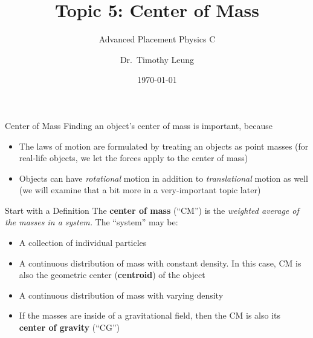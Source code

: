 \documentclass[12pt,compress,aspectratio=169]{beamer}
\title{Topic 5: Center of Mass}
\subtitle{Advanced Placement Physics C}
\author[TML]{Dr.\ Timothy Leung}
\institute{Olympiads School}
\date{\today}
\begin{document}
\begin{frame}
  \maketitle
\end{frame}



%  



\begin{frame}{Center of Mass}
  Finding an object's center of mass is important, because
  \begin{itemize}
  \item The laws of motion are formulated by treating an objects as point
    masses (for real-life objects, we let the forces apply to the center of
    mass)
  \item Objects can have \emph{rotational} motion in addition to
    \emph{translational} motion as well (we will examine that a bit more in a
    very-important topic later)
  \end{itemize}
\end{frame}



\begin{frame}{Start with a Definition}
  The \textbf{center of mass} (``CM'') is the \emph{weighted average of the
    masses in a system.} The ``system'' may be:
  \begin{itemize}
  \item A collection of individual particles
  \item A continuous distribution of mass with constant density. In this case,
    CM is also the geometric center (\textbf{centroid}) of the object
  \item A continuous distribution of mass with varying density
  \item If the masses are inside of a gravitational field, then the CM is also
    its \textbf{center of gravity} (``CG'')
  \end{itemize}
\end{frame}
\end{document}
